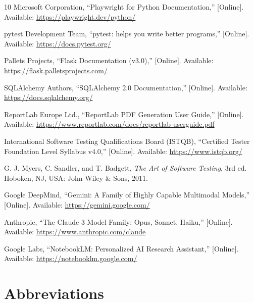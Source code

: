 \documentclass{InternshipReport}
\begin{document}
\clearpage
\begin{thebibliography}{10}
Microsoft Corporation, ``Playwright for Python Documentation,'' [Online]. Available: \url{https://playwright.dev/python/}

pytest Development Team, ``pytest: helps you write better programs,'' [Online]. Available: \url{https://docs.pytest.org/}

Pallets Projects, ``Flask Documentation (v3.0),'' [Online]. Available: \url{https://flask.palletsprojects.com/}

SQLAlchemy Authors, ``SQLAlchemy 2.0 Documentation,'' [Online]. Available: \url{https://docs.sqlalchemy.org/}

ReportLab Europe Ltd., ``ReportLab PDF Generation User Guide,'' [Online]. Available: \url{https://www.reportlab.com/docs/reportlab-userguide.pdf}

International Software Testing Qualifications Board (ISTQB), ``Certified Tester Foundation Level Syllabus v4.0,'' [Online]. Available: \url{https://www.istqb.org/}

G. J. Myers, C. Sandler, and T. Badgett, \textit{The Art of Software Testing}, 3rd ed. Hoboken, NJ, USA: John Wiley \& Sons, 2011.

Google DeepMind, ``Gemini: A Family of Highly Capable Multimodal Models,'' [Online]. Available: \url{https://gemini.google.com/}

Anthropic, ``The Claude 3 Model Family: Opus, Sonnet, Haiku,'' [Online]. Available: \url{https://www.anthropic.com/claude}

Google Labs, ``NotebookLM: Personalized AI Research Assistant,'' [Online]. Available: \url{https://notebooklm.google.com/}
\end{thebibliography}


\clearpage
\chapter*{Abbreviations}
\end{document}
